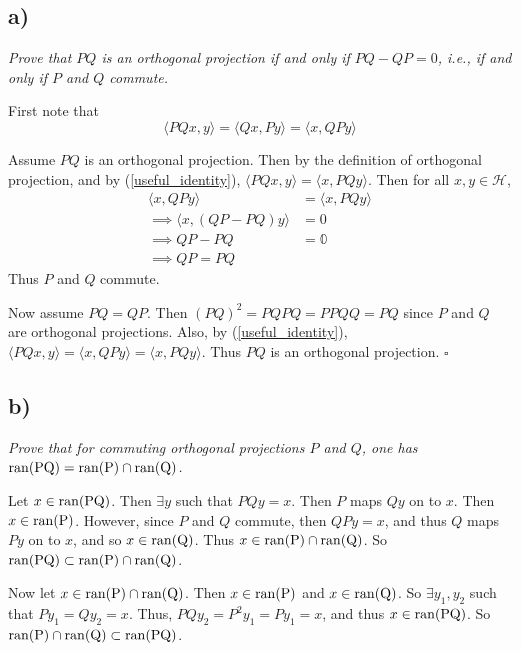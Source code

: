 \documentclass[12pt]{article}
\theoremstyle{plain}
\begin{document}
\subsection*{ a)}
\emph{Prove that $PQ$ is an orthogonal projection if and only if $PQ - QP = 0$, i.e., if and only if $P$ and $Q$ commute.} \medskip

First note that
\begin{equation}
    \label{useful_identity}
    \langle PQx,y \rangle = \langle Qx, Py \rangle = \langle x, QPy \rangle
\end{equation}

Assume $PQ$ is an orthogonal projection.  Then by the definition of orthogonal projection, and by (\ref{useful_identity}), $\langle PQx, y\rangle = \langle x, PQy \rangle$.  Then for all $x, y \in \mathcal{H}$,
\begin{align*}
    \langle x, QPy \rangle &= \langle x, PQy \rangle \\
    \implies \langle x, (QP - PQ)y \rangle &= 0 \\
    \implies QP - PQ &= \mathbb{0} \\
    \implies QP = PQ
\end{align*}
Thus $P$ and $Q$ commute.

Now assume $PQ = QP$.  Then $(PQ)^2 = PQPQ = PPQQ = PQ$ since $P$ and $Q$ are orthogonal projections.  Also, by (\ref{useful_identity}), $\langle PQx, y\rangle = \langle x, QPy \rangle = \langle x, PQy \rangle$.  Thus $PQ$ is an orthogonal projection. \hfill $\square$

\subsection*{ b)}
\emph{Prove that for commuting orthogonal projections $P$ and $Q$, one has $\rm{ran}(PQ) = \rm{ran}(P)\cap\rm{ran}(Q)$.} \medskip

Let $x \in \rm{ran}(PQ)$.  Then $\exists y$ such that $PQy = x$.  Then $P$ maps $Qy$ on to $x$.  Then $x \in \rm{ran}(P)$.  However, since $P$ and $Q$ commute, then $QPy = x$, and thus $Q$ maps $Py$ on to $x$, and so $x \in \rm{ran}(Q)$.  Thus $x \in \rm{ran}(P)\cap\rm{ran}(Q)$.  So $\rm{ran}(PQ) \subset \rm{ran}(P)\cap\rm{ran}(Q)$. \medskip

Now let $x \in \rm{ran}(P)\cap\rm{ran}(Q)$.  Then $x \in \rm{ran}(P)$ and $x \in \rm{ran}(Q)$.  So $\exists y_1, y_2$ such that $Py_1 = Qy_2 = x$.  Thus, $PQy_2 = P^2y_1 = Py_1 = x$, and thus $x \in \rm{ran}(PQ)$.  So $\rm{ran}(P)\cap\rm{ran}(Q) \subset \rm{ran}(PQ)$. \medskip
\end{document}
